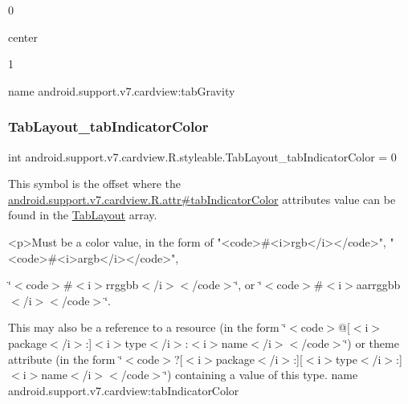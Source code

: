 0

{\ttfamily center}

1

name android.\+support.\+v7.\+cardview\+:tab\+Gravity \mbox{\label{classandroid_1_1support_1_1v7_1_1cardview_1_1R_1_1styleable_a5a446283d0134089aec8213efafa7b65}} 
\subsubsection{\texorpdfstring{Tab\+Layout\+\_\+tab\+Indicator\+Color}{TabLayout\_tabIndicatorColor}}
{\footnotesize\ttfamily int android.\+support.\+v7.\+cardview.\+R.\+styleable.\+Tab\+Layout\+\_\+tab\+Indicator\+Color = 0\hspace{0.3cm}{\ttfamily [static]}}

This symbol is the offset where the \hyperlink{classandroid_1_1support_1_1v7_1_1cardview_1_1R_1_1attr_a127ad47732b6d288a076ced2aab96163}{android.\+support.\+v7.\+cardview.\+R.\+attr\#tab\+Indicator\+Color} attribute\textquotesingle{}s value can be found in the \hyperlink{classandroid_1_1support_1_1v7_1_1cardview_1_1R_1_1styleable_afa0dc9366603eaec9e38d99273ba8512}{Tab\+Layout} array.

\begin{DoxyVerb}      <p>Must be a color value, in the form of "<code>#<i>rgb</i></code>", "<code>#<i>argb</i></code>",
\end{DoxyVerb}
 \char`\"{}$<$code$>$\#$<$i$>$rrggbb$<$/i$>$$<$/code$>$\char`\"{}, or \char`\"{}$<$code$>$\#$<$i$>$aarrggbb$<$/i$>$$<$/code$>$\char`\"{}. 

This may also be a reference to a resource (in the form \char`\"{}$<$code$>$@\mbox{[}$<$i$>$package$<$/i$>$\+:\mbox{]}$<$i$>$type$<$/i$>$\+:$<$i$>$name$<$/i$>$$<$/code$>$\char`\"{}) or theme attribute (in the form \char`\"{}$<$code$>$?\mbox{[}$<$i$>$package$<$/i$>$\+:\mbox{]}\mbox{[}$<$i$>$type$<$/i$>$\+:\mbox{]}$<$i$>$name$<$/i$>$$<$/code$>$\char`\"{}) containing a value of this type.  name android.\+support.\+v7.\+cardview\+:tab\+Indicator\+Color \mbox{\label{classandroid_1_1support_1_1v7_1_1cardview_1_1R_1_1styleable_a1105a0d35da90cf70f0f89791a05d979}} 
